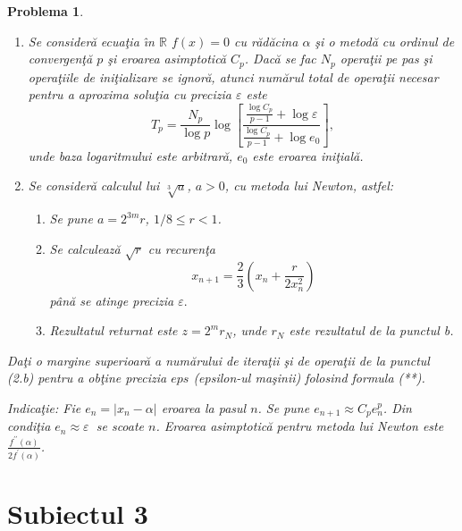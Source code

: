 \documentclass{article}%
\newtheorem{problem}[theorem]{Problema}
\begin{document}
\begin{problem}
\begin{enumerate}
\item Se consider\u{a} ecua\c{t}ia \^{\i}n $\mathbb{R}$ $f(x)=0$ cu
r\u{a}d\u{a}cina $\alpha$ \c{s}i o metod\u{a} cu ordinul de
convergen\c{t}\u{a} $p$ \c{s}i eroarea asimptotic\u{a} $C_{p}$. Dac\u{a} se
fac $N_{p}$ opera\c{t}ii pe pas \c{s}i opera\c{t}iile de ini\c{t}ializare se
ignor\u{a}, atunci num\u{a}rul total de opera\c{t}ii necesar pentru a aproxima
solu\c{t}ia cu precizia $\varepsilon$ este%
\begin{equation}
T_{p}=\frac{N_{p}}{\log p}\log\left[  \frac{\frac{\log C_{p}}{p-1}%
+\log\varepsilon}{\frac{\log C_{p}}{p-1}+\log e_{0}}\right]  ,\tag{**}%
\end{equation}
unde baza logaritmului este arbitrar\u{a}, $e_{0}$ este eroarea ini\c{t}ial\u{a}.

\item Se consider\u{a} calculul lui $\sqrt[3]{a}$, $a>0$, cu metoda lui
Newton, astfel:

\begin{enumerate}
\item Se pune $a=2^{3m}r$, $1/8\leq r<1$.

\item Se calculeaz\u{a} $\sqrt{r}$ cu recuren\c{t}a
\[
x_{n+1}=\frac{2}{3}\left(  x_{n}+\frac{r}{2x_{n}^{2}}\right)
\]
p\^{a}n\u{a} se atinge precizia $\varepsilon.$

\item Rezultatul returnat este $z=2^{m}r_{N}$, unde $r_{N}$ este rezultatul de
la punctul b.
\end{enumerate}
\end{enumerate}

Da\c{t}i o margine superioar\u{a} a num\u{a}rului de itera\c{t}ii \c{s}i de
opera\c{t}ii de la punctul (2.b) pentru a ob\c{t}ine precizia $eps$
(epsilon-ul ma\c{s}inii) folosind formula (**).

\emph{Indica\c{t}ie}: Fie $e_{n}=|x_{n}-\alpha|$ eroarea la pasul $n$. Se pune
$e_{n+1}\approx C_{p}e_{n}^{p}$. Din condi\c{t}ia $e_{n}\approx\varepsilon$
$\ $se scoate $n$. Eroarea asimptotic\u{a} pentru metoda lui Newton este
$\frac{f^{\prime\prime}(\alpha)}{2f^{\prime}(\alpha)}$.
\end{problem}

\newpage

\section{Subiectul 3}
\end{document}
